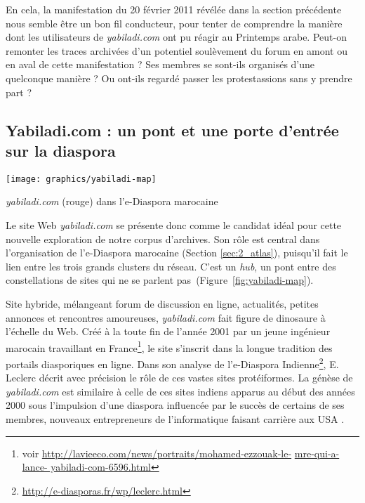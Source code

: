 \documentclass[symmetric,justified,marginals=raggedouter]{tufte-book}
\begin{document}
En cela, la manifestation du 20 février 2011 révélée dans la section précédente nous semble être un bon fil conducteur, pour tenter de comprendre la manière dont les utilisateurs de \textit{yabiladi.com} ont pu réagir au Printemps arabe. Peut-on remonter les traces archivées d'un potentiel soulèvement du forum en amont ou en aval de cette manifestation ? Ses membres se sont-ils organisés d'une quelconque manière ? Ou ont-ils regardé passer les protestassions sans y prendre part ? 

\subsection{Yabiladi.com : un pont et une porte d'entrée sur la diaspora}

\begin{marginfigure}%
  \texttt{[image: graphics/yabiladi-map]}
  \vspace*{0.2cm}  
  \caption{\textit{yabiladi.com} (rouge) dans l'e-Diaspora marocaine}
  \label{fig:yabiladi-map}
\end{marginfigure} 

\noindent Le site Web \textit{yabiladi.com} se présente donc comme le candidat idéal pour cette nouvelle exploration de notre corpus d'archives.  Son rôle est central dans l'organisation de l'e-Diaspora marocaine (Section \ref{sec:2_atlas}), puisqu'il fait le lien entre les trois grands clusters du réseau. C'est un \textit{hub}, un pont entre des constellations de sites qui ne se parlent pas~(Figure~\ref{fig:yabiladi-map}).

Site hybride, mélangeant forum de discussion en ligne, actualités, petites annonces et rencontres amoureuses, \textit{yabiladi.com} fait figure de dinosaure à l'échelle du Web. Créé à la toute fin de l'année 2001 par un jeune ingénieur marocain travaillant en France\footnote{\RaggedOuter voir \url{http://lavieeco.com/news/portraits/mohamed-ezzouak-le-} \url{mre-qui-a-lance-
yabiladi-com-6596.html}}, le site s'inscrit dans la longue tradition des portails diasporiques en ligne. Dans son analyse de l'e-Diaspora Indienne\footnote{\RaggedOuter \url{http://e-diasporas.fr/wp/leclerc.html}}, E. Leclerc décrit avec précision le rôle de ces vastes sites protéiformes. La génèse de \textit{yabiladi.com} est similaire à celle de ces sites indiens apparus au début des années 2000 sous l'impulsion d'une diaspora influencée par le succès de certains de ses membres, nouveaux entrepreneurs de l'informatique faisant carrière aux USA \citep{leclerc_cyberespace_2012}.\\
\end{document}
